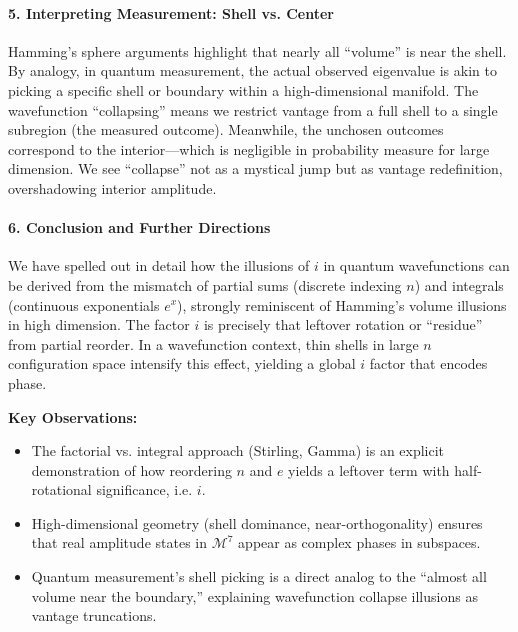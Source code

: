 \documentclass{article}
\begin{document}
\paragraph{5. Interpreting Measurement: Shell vs. Center}

Hamming’s sphere arguments highlight that nearly all “volume” is near the shell. By analogy, in quantum measurement, the actual observed eigenvalue is akin to picking a specific shell or boundary within a high-dimensional manifold. The wavefunction “collapsing” means we restrict vantage from a full shell to a single subregion (the measured outcome). Meanwhile, the unchosen outcomes correspond to the interior---which is negligible in probability measure for large dimension. We see “collapse” not as a mystical jump but as vantage redefinition, overshadowing interior amplitude.

\paragraph{6. Conclusion and Further Directions}

We have spelled out in detail how the illusions of $i$ in quantum wavefunctions can be derived from the mismatch of partial sums (discrete indexing $n$) and integrals (continuous exponentials $e^x$), strongly reminiscent of Hamming’s volume illusions in high dimension. The factor $i$ is precisely that leftover rotation or “residue” from partial reorder. In a wavefunction context, thin shells in large $n$ configuration space intensify this effect, yielding a global $i$ factor that encodes phase.

\textbf{Key Observations:}
\begin{itemize}
\item The factorial vs. integral approach (Stirling, Gamma) is an explicit demonstration of how reordering $n$ and $e$ yields a leftover term with half-rotational significance, i.e. $i$.\vspace{-6pt}
\item High-dimensional geometry (shell dominance, near-orthogonality) ensures that real amplitude states in $\mathcal{M}^7$ appear as complex phases in subspaces.\vspace{-6pt}
\item Quantum measurement’s shell picking is a direct analog to the “almost all volume near the boundary,” explaining wavefunction collapse illusions as vantage truncations.
\end{itemize}
\end{document}
